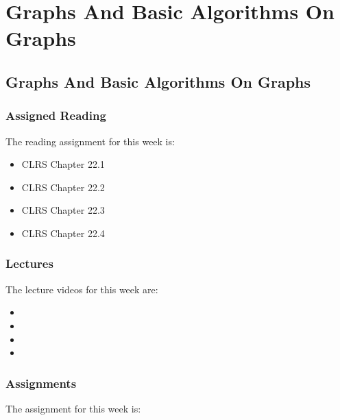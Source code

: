 \clearpage

\renewcommand{\ChapTitle}{Graphs And Basic Algorithms On Graphs}
\renewcommand{\SectionTitle}{Graphs And Basic Algorithms On Graphs}

\chapter{\ChapTitle}
\section{\SectionTitle}

\subsection{Assigned Reading}

The reading assignment for this week is:

\begin{itemize}
    \item CLRS Chapter 22.1
    \item CLRS Chapter 22.2
    \item CLRS Chapter 22.3
    \item CLRS Chapter 22.4
\end{itemize}

\subsection{Lectures}

The lecture videos for this week are:

\begin{itemize}
    \item {}
    \item {}
    \item {}
    \item {}
\end{itemize}

\subsection{Assignments}

The assignment for this week is:

